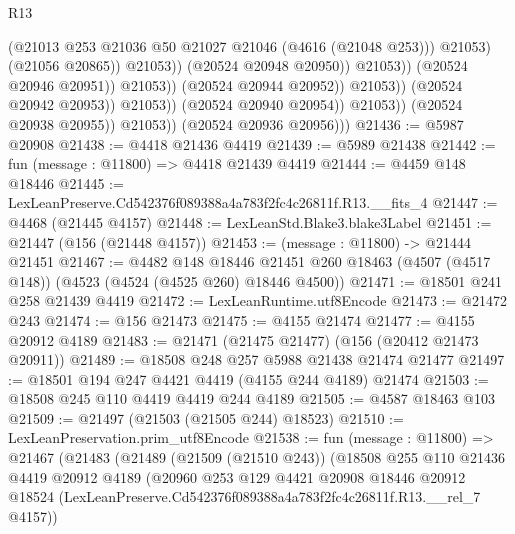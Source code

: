 \begin{lexlean}{R13}
\begin{coremodule}
                                                    (@21013
                                                      @253
                                                      @21036
                                                      @50
                                                      @21027
                                                      @21046
                                                      (@4616 (@21048 @253)))
                                                    @21053)
                                                  (@21056 @20865))
                                                @21053))
                                            (@20524 @20948 @20950))
                                          @21053))
                                      (@20524 @20946 @20951))
                                    @21053))
                                (@20524 @20944 @20952))
                              @21053))
                          (@20524 @20942 @20953))
                        @21053))
                    (@20524 @20940 @20954))
                  @21053))
              (@20524 @20938 @20955))
            @21053))
        (@20524 @20936 @20956)))
@21436 := @5987 @20908
@21438 := @4418 @21436 @4419
@21439 := @5989 @21438
@21442 := fun (message : @11800) => @4418 @21439 @4419
@21444 := @4459 @148 @18446
@21445 := LexLeanPreserve.Cd542376f089388a4a783f2fc4c26811f.R13.__fits_4
@21447 := @4468 (@21445 @4157)
@21448 := LexLeanStd.Blake3.blake3Label
@21451 := @21447 (@156 (@21448 @4157))
@21453 := (message : @11800) -> @21444 @21451
@21467 := @4482
    @148
    @18446
    @21451
    @260
    @18463
    (@4507 (@4517 @148))
    (@4523 (@4524 (@4525 @260) @18446 @4500))
@21471 := @18501 @241 @258 @21439 @4419
@21472 := LexLeanRuntime.utf8Encode
@21473 := @21472 @243
@21474 := @156 @21473
@21475 := @4155 @21474
@21477 := @4155 @20912 @4189
@21483 := @21471 (@21475 @21477) (@156 (@20412 @21473 @20911))
@21489 := @18508 @248 @257 @5988 @21438 @21474 @21477
@21497 := @18501 @194 @247 @4421 @4419 (@4155 @244 @4189) @21474
@21503 := @18508 @245 @110 @4419 @4419 @244 @4189
@21505 := @4587 @18463 @103
@21509 := @21497 (@21503 (@21505 @244) @18523)
@21510 := LexLeanPreservation.prim_utf8Encode
@21538 := fun (message : @11800) =>
  @21467
    (@21483
      (@21489
        (@21509 (@21510 @243))
        (@18508
          @255
          @110
          @21436
          @4419
          @20912
          @4189
          (@20960
            @253
            @129
            @4421
            @20908
            @18446
            @20912
            @18524
            (LexLeanPreserve.Cd542376f089388a4a783f2fc4c26811f.R13.__rel_7 @4157))

\end{coremodule}
\end{lexlean}
